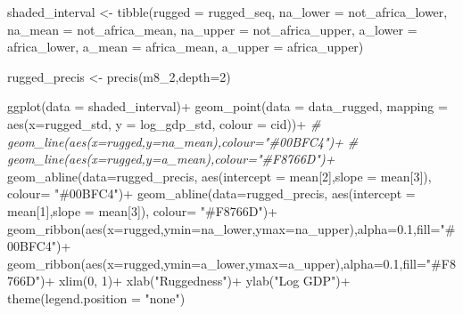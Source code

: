 \documentclass[
]{book}
\newenvironment{Shaded}{\begin{snugshade}}{\end{snugshade}}
\newcommand{\AttributeTok}[1]{\textcolor[rgb]{0.77,0.63,0.00}{#1}}
\newcommand{\CommentTok}[1]{\textcolor[rgb]{0.56,0.35,0.01}{\textit{#1}}}
\newcommand{\DecValTok}[1]{\textcolor[rgb]{0.00,0.00,0.81}{#1}}
\newcommand{\FloatTok}[1]{\textcolor[rgb]{0.00,0.00,0.81}{#1}}
\newcommand{\FunctionTok}[1]{\textcolor[rgb]{0.00,0.00,0.00}{#1}}
\newcommand{\NormalTok}[1]{#1}
\newcommand{\OtherTok}[1]{\textcolor[rgb]{0.56,0.35,0.01}{#1}}
\newcommand{\SpecialCharTok}[1]{\textcolor[rgb]{0.00,0.00,0.00}{#1}}
\newcommand{\StringTok}[1]{\textcolor[rgb]{0.31,0.60,0.02}{#1}}
\begin{document}
\begin{Shaded}
\begin{Highlighting}[]
\NormalTok{shaded\_interval }\OtherTok{\textless{}{-}} \FunctionTok{tibble}\NormalTok{(}\AttributeTok{rugged =}\NormalTok{ rugged\_seq, }\AttributeTok{na\_lower =}\NormalTok{ not\_africa\_lower, }\AttributeTok{na\_mean =}\NormalTok{ not\_africa\_mean, }\AttributeTok{na\_upper =}\NormalTok{ not\_africa\_upper,}
                                               \AttributeTok{a\_lower =}\NormalTok{ africa\_lower, }\AttributeTok{a\_mean =}\NormalTok{ africa\_mean, }\AttributeTok{a\_upper =}\NormalTok{ africa\_upper)}


\NormalTok{rugged\_precis }\OtherTok{\textless{}{-}} \FunctionTok{precis}\NormalTok{(m8\_2,}\AttributeTok{depth=}\DecValTok{2}\NormalTok{)}

\FunctionTok{ggplot}\NormalTok{(}\AttributeTok{data =}\NormalTok{ shaded\_interval)}\SpecialCharTok{+}
  \FunctionTok{geom\_point}\NormalTok{(}\AttributeTok{data =}\NormalTok{ data\_rugged, }\AttributeTok{mapping =} \FunctionTok{aes}\NormalTok{(}\AttributeTok{x=}\NormalTok{rugged\_std, }\AttributeTok{y =}\NormalTok{ log\_gdp\_std, }\AttributeTok{colour =}\NormalTok{ cid))}\SpecialCharTok{+}
\CommentTok{\# geom\_line(aes(x=rugged,y=na\_mean),colour="\#00BFC4")+}
\CommentTok{\# geom\_line(aes(x=rugged,y=a\_mean),colour="\#F8766D")+}
  \FunctionTok{geom\_abline}\NormalTok{(}\AttributeTok{data=}\NormalTok{rugged\_precis, }\FunctionTok{aes}\NormalTok{(}\AttributeTok{intercept =}\NormalTok{ mean[}\DecValTok{2}\NormalTok{],}\AttributeTok{slope =}\NormalTok{ mean[}\DecValTok{3}\NormalTok{]), }\AttributeTok{colour=} \StringTok{"\#00BFC4"}\NormalTok{)}\SpecialCharTok{+} 
  \FunctionTok{geom\_abline}\NormalTok{(}\AttributeTok{data=}\NormalTok{rugged\_precis, }\FunctionTok{aes}\NormalTok{(}\AttributeTok{intercept =}\NormalTok{ mean[}\DecValTok{1}\NormalTok{],}\AttributeTok{slope =}\NormalTok{ mean[}\DecValTok{3}\NormalTok{]), }\AttributeTok{colour=} \StringTok{"\#F8766D"}\NormalTok{)}\SpecialCharTok{+}
  \FunctionTok{geom\_ribbon}\NormalTok{(}\FunctionTok{aes}\NormalTok{(}\AttributeTok{x=}\NormalTok{rugged,}\AttributeTok{ymin=}\NormalTok{na\_lower,}\AttributeTok{ymax=}\NormalTok{na\_upper),}\AttributeTok{alpha=}\FloatTok{0.1}\NormalTok{,}\AttributeTok{fill=}\StringTok{"\#00BFC4"}\NormalTok{)}\SpecialCharTok{+}
  \FunctionTok{geom\_ribbon}\NormalTok{(}\FunctionTok{aes}\NormalTok{(}\AttributeTok{x=}\NormalTok{rugged,}\AttributeTok{ymin=}\NormalTok{a\_lower,}\AttributeTok{ymax=}\NormalTok{a\_upper),}\AttributeTok{alpha=}\FloatTok{0.1}\NormalTok{,}\AttributeTok{fill=}\StringTok{"\#F8766D"}\NormalTok{)}\SpecialCharTok{+}
  \FunctionTok{xlim}\NormalTok{(}\DecValTok{0}\NormalTok{, }\DecValTok{1}\NormalTok{)}\SpecialCharTok{+}
  \FunctionTok{xlab}\NormalTok{(}\StringTok{"Ruggedness"}\NormalTok{)}\SpecialCharTok{+}
  \FunctionTok{ylab}\NormalTok{(}\StringTok{"Log GDP"}\NormalTok{)}\SpecialCharTok{+}
  \FunctionTok{theme}\NormalTok{(}\AttributeTok{legend.position =}  \StringTok{"none"}\NormalTok{)}
\end{Highlighting}
\end{Shaded}
\end{document}
